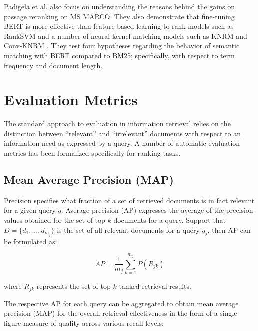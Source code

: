 Padigela et al. \cite{Padigela:1905.01758:2019} also focus on understanding the reasons behind the gains on passage reranking on MS MARCO.
They also demonstrate that fine-tuning BERT is more effective than feature based learning to rank models such as RankSVM \cite{joachims2002optimizing} and a number of neural kernel matching models such as KNRM \cite{xiong2017knrm} and Conv-KNRM \cite{dai2018convolutional}.
They test four hypotheses regarding the behavior of semantic matching with BERT compared to BM25; specifically, with respect to term frequency and document length.

\section{Evaluation Metrics}

The standard approach to evaluation in information retrieval relies on the distinction between ``relevant'' and ``irrelevant'' documents with respect to an information need as expressed by a query.
A number of automatic evaluation metrics has been formalized specifically for ranking tasks.

\subsection{Mean Average Precision (MAP)}

Precision specifies what fraction of a set of retrieved documents is in fact relevant for a given query $ q $.
Average precision (AP) expresses the average of the precision values obtained for the set of top $ k $ documents for a query.
Support that $ D = \{d_1, ..., d_{m_j}\} $ is the set of all relevant documents for a query $ q_j $, then AP can be formulated as:

\begin{equation}
AP = \frac{1}{m_j} \sum^{m_j} _{k = 1} P(R_{jk})
\end{equation}

where $ R_{jk} $ represents the set of top $ k $ tanked retrieval results.

The respective AP for each query can be aggregated to obtain mean average precision (MAP) for the overall retrieval effectiveness in the form of a single-figure measure of quality across various recall levels:

